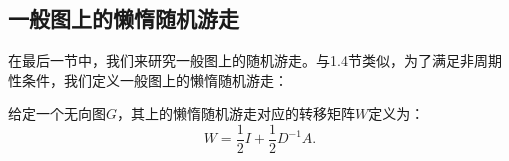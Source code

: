 \documentclass[lang=cn,newtx,10pt,scheme=chinese,chinesefont=nofont,citestyle=gb7714-2015, bibstyle=gb7714-2015]{elegantbook}
\begin{document}
\begin{refsection}
\begin{theorem}

                    
            \end{theorem}       

    


\subsection{一般图上的懒惰随机游走}

在最后一节中，我们来研究一般图上的随机游走。与1.4节类似，为了满足非周期性条件，我们定义一般图上的懒惰随机游走：

\begin{definition}[懒惰随机游走]
    \label{defn:lazy-random-walk-general}
    给定一个无向图$G$，其上的懒惰随机游走对应的转移矩阵$W$定义为：\[W=\frac{1}{2}I+\frac{1}{2}D^{-1}A.\]
\end{definition}


\end{refsection}
\end{document}
